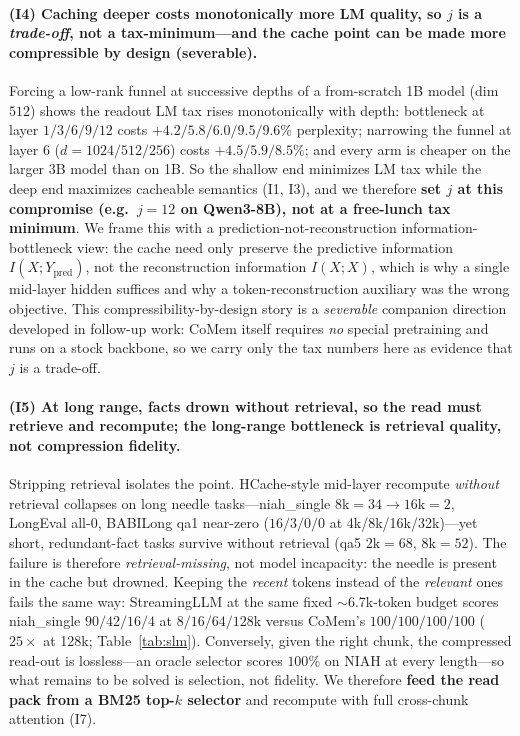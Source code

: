 \paragraph{(I4) Caching deeper costs monotonically more LM quality, so $j$ is a
\emph{trade-off}, not a tax-minimum---and the cache point can be made more
compressible by design (severable).} Forcing a low-rank funnel at successive
depths of a from-scratch 1B model (dim $512$) shows the readout LM tax rises
monotonically with depth: bottleneck at layer $1/3/6/9/12$ costs
$+4.2/5.8/6.0/9.5/9.6\%$ perplexity; narrowing the funnel at layer $6$
($d{=}1024/512/256$) costs $+4.5/5.9/8.5\%$; and every arm is cheaper on the
larger 3B model than on 1B. So the shallow end minimizes LM tax while the deep
end maximizes cacheable semantics (I1, I3), and we therefore
\textbf{set $j$ at this compromise (e.g.\ $j{=}12$ on Qwen3-8B), not at a
free-lunch tax minimum}. We frame this with a prediction-not-reconstruction
information-bottleneck view: the cache need only preserve the predictive
information $I(X;Y_{\text{pred}})$, not the reconstruction information
$I(X;X)$, which is why a single mid-layer hidden suffices and why a
token-reconstruction auxiliary was the wrong objective. This
compressibility-by-design story is a \emph{severable} companion direction
developed in follow-up work: CoMem itself requires
\emph{no} special pretraining and runs on a stock backbone, so we carry only the
tax numbers here as evidence that $j$ is a trade-off.

\paragraph{(I5) At long range, facts drown without retrieval, so the read must
retrieve and recompute; the long-range bottleneck is retrieval quality, not
compression fidelity.} Stripping retrieval isolates the point. HCache-style
mid-layer recompute \emph{without} retrieval \citep{hcache} collapses on long
needle tasks---niah\_single $8\text{k}{=}34\to16\text{k}{=}2$, LongEval all-$0$,
BABILong qa1 near-zero ($16/3/0/0$ at 4k/8k/16k/32k)---yet short,
redundant-fact tasks survive without retrieval (qa5 $2\text{k}{=}68$,
$8\text{k}{=}52$). The failure is therefore \emph{retrieval-missing}, not model
incapacity: the needle is present in the cache but drowned. Keeping the
\emph{recent} tokens instead of the \emph{relevant} ones fails the same way:
StreamingLLM \citep{streamingllm} at the same fixed $\sim$6.7k-token budget
scores niah\_single $90/42/16/4$ at $8/16/64/128$k versus CoMem's
$100/100/100/100$ ($25\times$ at 128k; Table~\ref{tab:slm}). Conversely, given
the right chunk, the compressed read-out is lossless---an oracle selector scores
$100\%$ on NIAH at every length---so what remains to be solved is selection, not
fidelity. We therefore \textbf{feed the read pack from a BM25 top-$k$ selector}
and recompute with full cross-chunk attention (I7).

